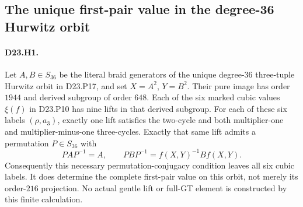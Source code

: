 \subsection{The unique first-pair value in the degree-36 Hurwitz orbit}

\paragraph{D23.H1.}
Let $A,B\in S_{36}$ be the literal braid generators of the unique
degree-$36$ three-tuple Hurwitz orbit in D23.P17, and set
$X=A^2$, $Y=B^2$. Their pure image has order $1944$ and derived
subgroup of order $648$. Each of the six marked cubic values
$\xi(f)$ in D23.P10 has nine lifts in that derived subgroup.
For each of these six labels $(\rho,a_3)$, exactly one lift
satisfies the two-cycle and both multiplier-one and
multiplier-minus-one three-cycles. Exactly that same lift admits
a permutation $P\in S_{36}$ with
\[
 PAP^{-1}=A,\qquad PBP^{-1}=f(X,Y)^{-1}Bf(X,Y).
\]
Consequently this necessary permutation-conjugacy condition
leaves all six cubic labels. It does determine the complete
first-pair value on this orbit, not merely its order-$216$
projection. No actual gentle lift or full-GT element is constructed
by this finite calculation.

